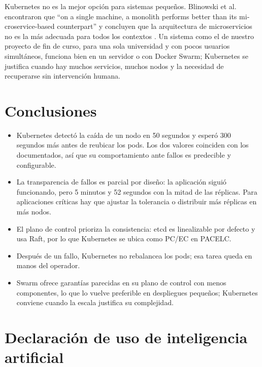 \documentclass[11pt,a4paper]{article}
\begin{document}
Kubernetes no es la mejor opción para sistemas pequeños. Blinowski et al. encontraron que \foreignquote{american}{on a single machine, a monolith performs better than its microservice-based counterpart} y concluyen que la arquitectura de microservicios no es la más adecuada para todos los contextos \cite[p.~20372]{blinowski2022}. Un sistema como el de nuestro proyecto de fin de curso, para una sola universidad y con pocos usuarios simultáneos, funciona bien en un servidor o con Docker Swarm; Kubernetes se justifica cuando hay muchos servicios, muchos nodos y la necesidad de recuperarse sin intervención humana.

\section{Conclusiones}

\begin{itemize}
  \item Kubernetes detectó la caída de un nodo en 50 segundos y esperó 300 segundos más antes de reubicar los pods. Los dos valores coinciden con los documentados, así que su comportamiento ante fallos es predecible y configurable.
  \item La transparencia de fallos es parcial por diseño: la aplicación siguió funcionando, pero 5 minutos y 52 segundos con la mitad de las réplicas. Para aplicaciones críticas hay que ajustar la tolerancia o distribuir más réplicas en más nodos.
  \item El plano de control prioriza la consistencia: etcd es linealizable por defecto y usa Raft, por lo que Kubernetes se ubica como PC/EC en PACELC.
  \item Después de un fallo, Kubernetes no rebalancea los pods; esa tarea queda en manos del operador.
  \item Swarm ofrece garantías parecidas en su plano de control con menos componentes, lo que lo vuelve preferible en despliegues pequeños; Kubernetes conviene cuando la escala justifica su complejidad.
\end{itemize}

\section*{Declaración de uso de inteligencia artificial}
\end{document}

